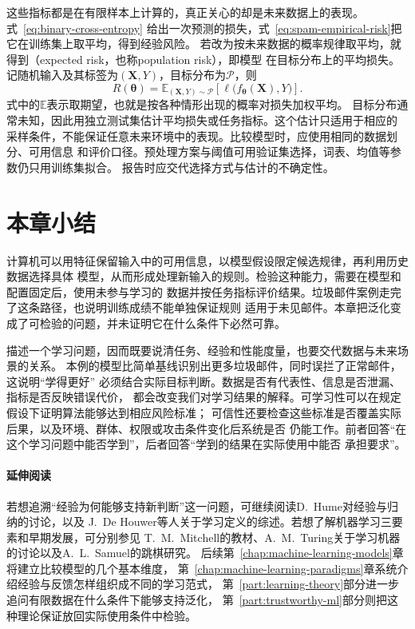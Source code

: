 这些指标都是在有限样本上计算的，真正关心的却是未来数据上的表现。式~\eqref{eq:binary-cross-entropy}
给出一次预测的损失，式~\eqref{eq:spam-empirical-risk}把它在训练集上取平均，得到经验风险。
若改为按未来数据的概率规律取平均，就得到（expected risk，也称population
risk），即模型
在目标分布上的平均损失。记随机输入及其标签为$(\bm{X},Y)$，目标分布为$\mathcal{P}$，则
\begin{equation}
  R(\bm{\theta})
  =\mathbb{E}_{(\bm{X},Y)\sim\mathcal{P}}
  \left[\ell\bigl(f_{\bm{\theta}}(\bm{X}),Y\bigr)\right].
  \label{eq:expected-risk}
\end{equation}
式中的$\mathbb{E}$表示取期望，也就是按各种情形出现的概率对损失加权平均。
目标分布通常未知，因此用独立测试集估计平均损失或任务指标。这个估计只适用于相应的
采样条件，不能保证任意未来环境中的表现。比较模型时，应使用相同的数据划分、可用信息
和评价口径。预处理方案与阈值可用验证集选择，词表、均值等参数仍只用训练集拟合。
报告时应交代选择方式与估计的不确定性。

\section{本章小结}
\label{sec:introduction-summary}

计算机可以用特征保留输入中的可用信息，以模型假设限定候选规律，再利用历史数据选择具体
模型，从而形成处理新输入的规则。检验这种能力，需要在模型和配置固定后，使用未参与学习的
数据并按任务指标评价结果。垃圾邮件案例走完了这条路径，也说明训练成绩不能单独保证规则
适用于未见邮件。本章把泛化变成了可检验的问题，并未证明它在什么条件下必然可靠。

描述一个学习问题，因而既要说清任务、经验和性能度量，也要交代数据与未来场景的关系。
本例的模型比简单基线识别出更多垃圾邮件，同时误拦了正常邮件，这说明“学得更好”
必须结合实际目标判断。数据是否有代表性、信息是否泄漏、指标是否反映错误代价，
都会改变我们对学习结果的解释。可学习性可以在规定假设下证明算法能够达到相应风险标准；
可信性还要检查这些标准是否覆盖实际后果，以及环境、群体、权限或攻击条件变化后系统是否
仍能工作。前者回答“在这个学习问题中能否学到”，后者回答“学到的结果在实际使用中能否
承担要求”。

\paragraph{延伸阅读}

若想追溯“经验为何能够支持新判断”这一问题，可继续阅读D.~Hume对经验与归纳的讨论，以及
J.~De Houwer等人关于学习定义的综述。若想了解机器学习三要素和早期发展，可分别参见
T.~M.~Mitchell的教材、A.~M.~Turing关于学习机器的讨论以及A.~L.~Samuel的跳棋研究。
后续第~\ref{chap:machine-learning-models}章将建立比较模型的几个基本维度，
第~\ref{chap:machine-learning-paradigms}章系统介绍经验与反馈怎样组织成不同的学习范式，
第~\ref{part:learning-theory}部分进一步追问有限数据在什么条件下能够支持泛化，
第~\ref{part:trustworthy-ml}部分则把这种理论保证放回实际使用条件中检验。
